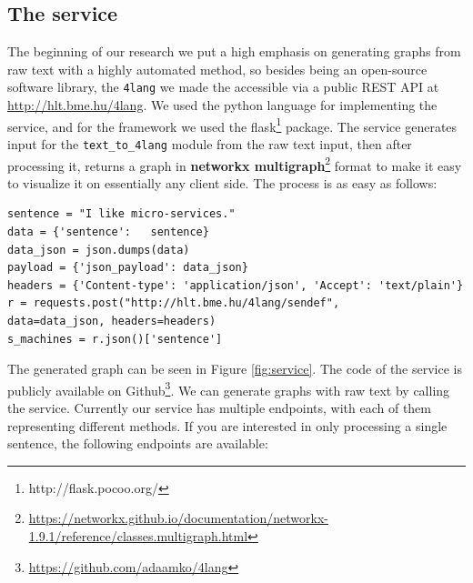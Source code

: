 \subsection{The service}
The beginning of our research we put a high emphasis on generating graphs from raw text with a highly automated method, so besides being an open-source software library,
the \texttt{4lang} we made the accessible via a public
REST API at \url{http://hlt.bme.hu/4lang}. We used the python language for implementing the service, and for the framework we used the flask\footnote{http://flask.pocoo.org/} package. The service generates input for the \texttt{text\_to\_4lang} module from the raw text input, then after processing it, returns a graph in \textbf{networkx multigraph}\footnote{\url{https://networkx.github.io/documentation/networkx-1.9.1/reference/classes.multigraph.html}} format to make it easy to visualize it on essentially any client side. The process is as easy as follows:
\begin{center}
	\begin{lstlisting}
sentence = "I like micro-services." 
data = {'sentence':   sentence}
data_json = json.dumps(data)
payload = {'json_payload': data_json}
headers = {'Content-type': 'application/json', 'Accept': 'text/plain'}
r = requests.post("http://hlt.bme.hu/4lang/sendef", 
data=data_json, headers=headers)
s_machines = r.json()['sentence']
\end{lstlisting}
\end{center}


The generated graph can be seen in Figure \ref{fig:service}. The code of the service is publicly available on Github\footnote{\url{https://github.com/adaamko/4lang}}. We can generate graphs with raw text by calling the service. Currently our service has multiple endpoints, with each of them representing different methods.
If you are interested in only processing a single sentence, the following endpoints are available:

